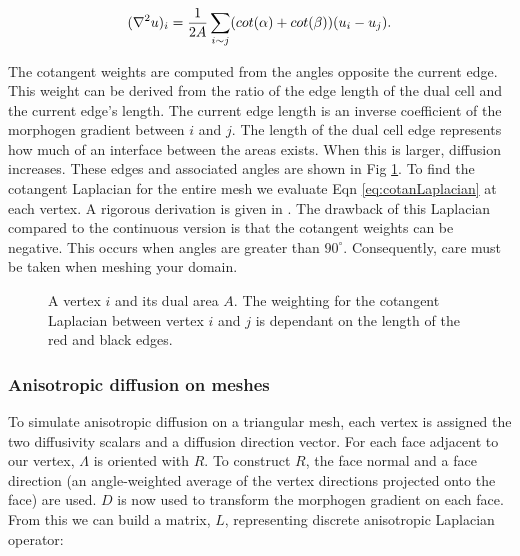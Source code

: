 \begin{equation}
	(\nabla^2{} u)_i = \frac{1}{2A} \sum_{i \sim j} (cot(\alpha) + cot(\beta)) (u_i - u_j).
	\label{eq:cotanLaplacian}
\end{equation}

The cotangent weights are computed from the angles opposite the current edge. This weight can be derived from the ratio of the edge length of the dual cell and the current edge's length. The current edge length is an inverse coefficient of the morphogen gradient between $i$ and $j$. The length of the dual cell edge represents how much of an interface between the areas exists. When this is larger, diffusion increases. These edges and associated angles are shown in Fig \ref{fig:dualMesh}. To find the cotangent Laplacian for the entire mesh we evaluate Eqn \ref{eq:cotanLaplacian} at each vertex. A rigorous derivation is given in \citep{Crane2013DGP}. The drawback of this Laplacian compared to the continuous version is that the cotangent weights can be negative. This occurs when angles are greater than $90^\circ$. Consequently, care must be taken when meshing your domain.

\begin{figure}[H]
	\centering
	\caption{A vertex $i$ and its dual area $A$. The weighting for the cotangent Laplacian between vertex $i$ and $j$ is dependant on the length of the red and black edges.}
	\label{fig:dualMesh}
\end{figure}


\subsubsection*{Anisotropic diffusion on meshes}
To simulate anisotropic diffusion on a triangular mesh, each vertex is assigned the two diffusivity scalars and a diffusion direction vector. For each face adjacent to our vertex, $\Lambda$ is oriented with $R$. To construct $R$, the face normal and a face direction (an angle-weighted average of the vertex directions projected onto the face) are used. $D$ is now used to transform the morphogen gradient on each face. From this we can build a matrix, $L$, representing discrete anisotropic Laplacian operator:

